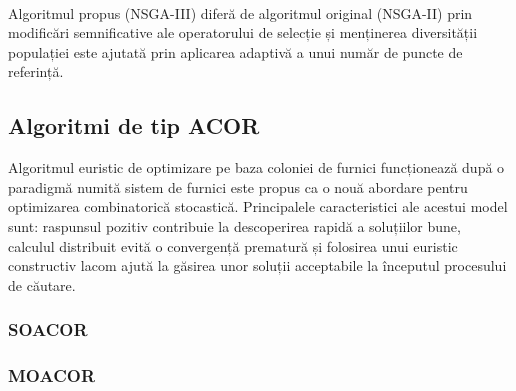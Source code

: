 \paragraph{}
Algoritmul propus (NSGA-III) diferă de algoritmul original (NSGA-II) prin modificări semnificative ale operatorului de selecție și menținerea diversității populației este ajutată prin aplicarea adaptivă a unui număr de puncte de referință. \cite{nsgaiii}
\subsection{Algoritmi de tip ACOR}
Algoritmul euristic de optimizare pe baza coloniei de furnici funcționează după o paradigmă numită sistem de furnici este propus ca o nouă abordare pentru optimizarea combinatorică stocastică. Principalele caracteristici ale acestui model sunt: raspunsul pozitiv contribuie la descoperirea rapidă a soluțiilor bune, calculul distribuit evită o convergență prematură și folosirea unui euristic constructiv lacom ajută la găsirea unor soluții acceptabile la începutul procesului de căutare.\cite{aco}
\subsubsection{SOACOR}
\subsubsection{MOACOR}